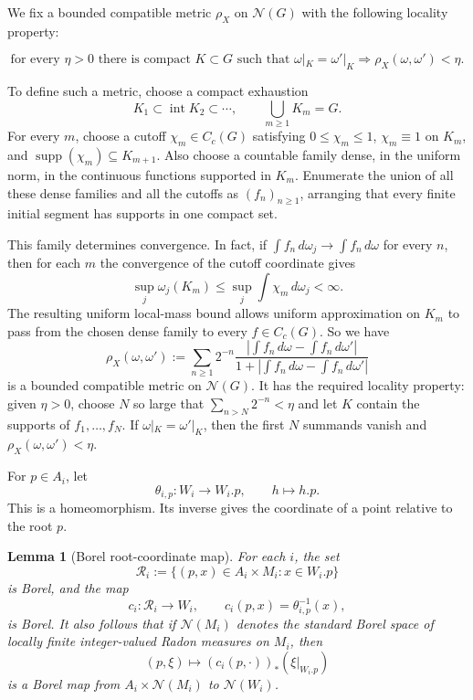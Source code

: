 \documentclass[12pt]{amsart}
\newtheorem{lemma}[lemma]{Lemma}
\theoremstyle{definition}
\newcommand{\cN}{\mathcal N}
\newcommand{\1}{\mathbf 1}
\newcommand{\dd}{\,d}
\newcommand{\abs}[1]{\left\lvert#1\right\rvert}
\begin{document}
We fix a bounded compatible metric $\rho_X$ on $\cN(G)$ with the following locality property:

\begin{equation}\label{eq:local-metric}
 \text{for every }\eta>0\text{ there is compact }K\subset G\text{ such that }
 \omega|_K=\omega'|_K\Longrightarrow \rho_X(\omega,\omega')<\eta.
\end{equation}

	To define such a metric, choose a compact exhaustion
\[
K_1\subset\operatorname{int}K_2\subset\cdots,
\qquad \bigcup_{m\geq1}K_m=G.
\]
For every $m$, choose a cutoff $\chi_m\in C_c(G)$ satisfying
$0\leq\chi_m\leq1$, $\chi_m\equiv1$ on $K_m$, and
$\operatorname{supp}(\chi_m)\subseteq K_{m+1}$.  Also choose a countable
family dense, in the uniform norm, in the continuous functions supported in
$K_m$. Enumerate the union of all these dense families and all the cutoffs as
$(f_n)_{n\geq1}$, arranging that every finite initial segment has supports in
one compact set.

This family determines convergence. In fact, if
$\int f_n\,d\omega_j\to\int f_n\,d\omega$ for every $n$, then for
each $m$ the convergence of the cutoff coordinate gives
\[
\sup_j\omega_j(K_m)
\leq \sup_j\int\chi_m\,d\omega_j<\infty.
\]
The resulting uniform local-mass bound allows uniform approximation on
$K_m$ to pass from the chosen dense family to every $f\in C_c(G)$.
So we have
\[
\rho_X(\omega,\omega')
:=\sum_{n\geq1}2^{-n}
\frac{\abs{\int f_n\dd\omega-\int f_n\dd\omega'}}
{1+\abs{\int f_n\dd\omega-\int f_n\dd\omega'}}
\]
is a bounded compatible metric on $\cN(G)$. It has the required locality
property: given $\eta>0$, choose $N$ so large that
$\sum_{n>N}2^{-n}<\eta$ and let $K$ contain the supports of
$f_1,\dots,f_N$. If $\omega|_K=\omega'|_K$, then the first $N$ summands
vanish and $\rho_X(\omega,\omega')<\eta$.

For $p\in A_i$, let
\[
 \theta_{i,p}:W_i\longrightarrow W_i.p,\qquad h\longmapsto h.p.
\]
This is a homeomorphism. Its inverse gives the coordinate of a point relative to the root $p$.

\begin{lemma}[Borel root-coordinate map]\label{lem:borel-root}
For each $i$, the set
\[
 \mathscr R_i:=\{(p,x)\in A_i\times M_i:x\in W_i.p\}
\]
is Borel, and the map
\[
 c_i:\mathscr R_i\longrightarrow W_i,
 \qquad c_i(p,x)=\theta_{i,p}^{-1}(x),
\]
is Borel. It also follows that if $\cN(M_i)$ denotes the standard Borel space of locally finite integer-valued Radon measures on $M_i$, then
\[
 (p,\xi)\longmapsto (c_i(p,\cdot))_*(\xi|_{W_i.p})
\]
is a Borel map from $A_i\times\cN(M_i)$ to $\cN(W_i)$.
\end{lemma}
\end{document}
